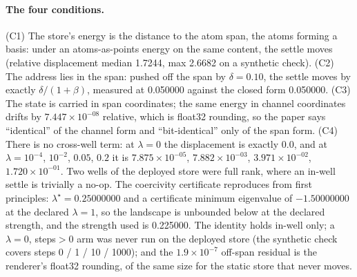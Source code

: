 \documentclass{article} %
\newcommand{\sci}[2]{\ensuremath{#1\times10^{#2}}}
\begin{document}
\paragraph{The four conditions.} (C1) The store's energy is the distance to the atom span, the
atoms forming a basis: under an atoms-as-points energy on the same content, the settle moves
(relative displacement median 1.7244, max 2.6682 on a synthetic check). (C2) The address lies in
the span: pushed off the span by $\delta=0.10$, the settle moves by exactly $\delta/(1+\beta)$,
measured at 0.050000 against the closed form 0.050000. (C3) The state is carried in span
coordinates; the same energy in channel coordinates drifts by \sci{7.447}{-08} relative, which is
float32 rounding, so the paper says ``identical'' of the channel form and ``bit-identical'' only
of the span form. (C4) There is no cross-well term: at $\lambda=0$ the displacement is exactly 0.0,
and at $\lambda=10^{-4}$, $10^{-2}$, $0.05$, $0.2$ it is \sci{7.875}{-05}, \sci{7.882}{-03},
\sci{3.971}{-02}, \sci{1.720}{-01}. Two wells of the deployed store were full rank, where an in-well
settle is trivially a no-op. The coercivity certificate reproduces from first principles:
$\lambda^\star=0.25000000$ and a certificate minimum eigenvalue of $-1.50000000$ at the declared
$\lambda=1$, so the landscape is unbounded below at the declared strength, and the strength used is
0.225000. %
The identity holds in-well only; a $\lambda=0$, steps$>0$ arm was never run on the deployed store
(the synthetic check covers steps 0 / 1 / 10 / 1000); and the \sci{1.9}{-7} off-span residual is the
renderer's float32 rounding, of the same size for the static store that never moves.
\end{document}
